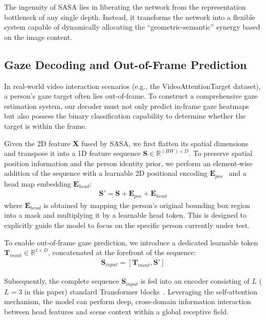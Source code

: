 \documentclass[sigconf,review,anonymous,screen]{acmart}
\begin{document}
The ingenuity of SASA lies in liberating the network from the representation bottleneck of any single depth. Instead, it transforms the network into a flexible system capable of dynamically allocating the ``geometric-semantic'' synergy based on the image content.

\subsection{Gaze Decoding and Out-of-Frame Prediction}

In real-world video interaction scenarios (e.g., the VideoAttentionTarget dataset), a person's gaze target often lies out-of-frame. To construct a comprehensive gaze estimation system, our decoder must not only predict in-frame gaze heatmaps but also possess the binary classification capability to determine whether the target is within the frame.

Given the 2D feature $\mathbf{X}$ fused by SASA, we first flatten its spatial dimensions and transpose it into a 1D feature sequence $\mathbf{S} \in \mathbb{R}^{(HW) \times D}$. To preserve spatial position information and the person identity prior, we perform an element-wise addition of the sequence with a learnable 2D positional encoding $\mathbf{E}_{pos}$~\cite{dosovitskiy2020image} and a head map embedding $\mathbf{E}_{head}$:
\begin{equation}
\label{eq:sequence_addition}
    \begin{aligned}
    \mathbf{S}' = \mathbf{S} + \mathbf{E}_{pos} + \mathbf{E}_{head}
    \end{aligned}
\end{equation}
where $\mathbf{E}_{head}$ is obtained by mapping the person's original bounding box region into a mask and multiplying it by a learnable head token. This is designed to explicitly guide the model to focus on the specific person currently under test.

To enable out-of-frame gaze prediction, we introduce a dedicated learnable token $\mathbf{T}_{inout} \in \mathbb{R}^{1 \times D}$, concatenated at the forefront of the sequence:
\begin{equation}
\label{eq:sequence_concat}
    \begin{aligned}
    \mathbf{S}_{input} = [\mathbf{T}_{inout}, \mathbf{S}']
    \end{aligned}
\end{equation}

Subsequently, the complete sequence $\mathbf{S}_{input}$ is fed into an encoder consisting of $L$ ($L=3$ in this paper) standard Transformer blocks~\cite{vaswani2017attention}. Leveraging the self-attention mechanism, the model can perform deep, cross-domain information interaction between head features and scene context within a global receptive field.
\end{document}
